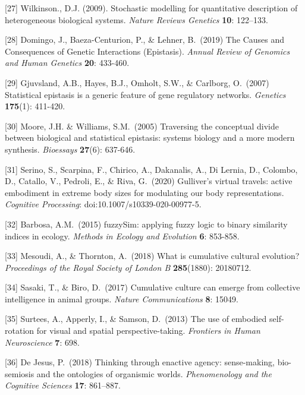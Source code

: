 \documentclass{article}
\begin{document}
[27] Wilkinson., D.J. (2009). Stochastic modelling for quantitative description of heterogeneous biological systems. {\it Nature Reviews Genetics} {\bf 10}: 122–133.

[28] Domingo, J., Baeza-Centurion, P., & Lehner, B.\ (2019) The Causes and Consequences of Genetic Interactions (Epistasis). {\it Annual Review of Genomics and Human Genetics} {\bf 20}: 433-460.
 
[29] Gjuvsland, A.B., Hayes, B.J., Omholt, S.W., & Carlborg, O.\ (2007) Statistical epistasis is a generic feature of gene regulatory networks. {\it Genetics} {\bf 175}(1): 411-420.
 
[30] Moore, J.H. & Williams, S.M.\ (2005) Traversing the conceptual divide between biological and statistical epistasis: systems biology and a more modern synthesis. {\it Bioessays} {\bf 27}(6): 637-646.

[31] Serino, S., Scarpina, F., Chirico, A., Dakanalis, A., Di Lernia, D., Colombo, D., Catallo, V., Pedroli, E., & Riva, G.\ (2020) Gulliver’s virtual travels: active embodiment in extreme body sizes for modulating our body representations. {\it Cognitive Processing}: doi:10.1007/s10339-020-00977-5.

[32] Barbosa, A.M.\ (2015) fuzzySim: applying fuzzy logic to binary similarity indices in ecology. {\it Methods in Ecology and Evolution} {\bf 6}: 853-858.

[33] Mesoudi, A., & Thornton, A.\ (2018) What is cumulative cultural evolution? {\it Proceedings of the Royal Society of London B} {\bf 285}(1880): 20180712.

[34] Sasaki, T., & Biro, D.\ (2017) Cumulative culture can emerge from collective intelligence in animal groups. {\it Nature Communications} {\bf 8}: 15049.

[35] Surtees, A., Apperly, I., & Samson, D.\ (2013) The use of embodied self-rotation for visual and spatial perspective-taking. {\it Frontiers in Human Neuroscience} {\bf 7}: 698.

[36] De Jesus, P.\ (2018) Thinking through enactive agency: sense-making, bio-semiosis and the ontologies of organismic worlds. {\it Phenomenology and the Cognitive Sciences} {\bf 17}: 861–887.
\end{document}
